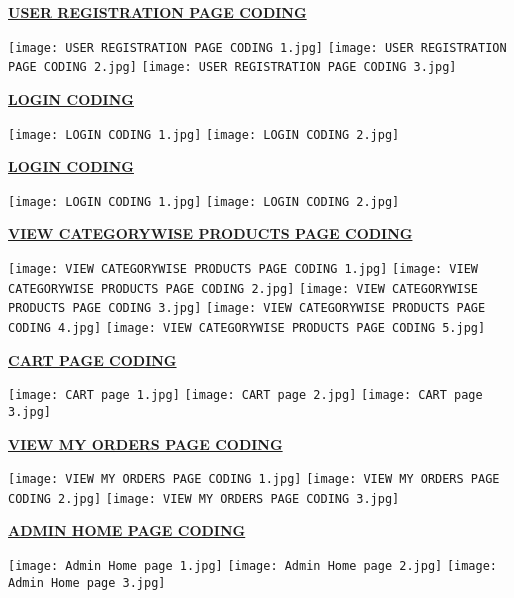 \documentclass[12pt]{report}
\begin{document}
    \pagebreak
    \textbf{\underline{\large USER REGISTRATION PAGE CODING}}
    \begin{center}
        \texttt{[image: USER REGISTRATION PAGE CODING 1.jpg]}
        \texttt{[image: USER REGISTRATION PAGE CODING 2.jpg]}
        \texttt{[image: USER REGISTRATION PAGE CODING 3.jpg]}
    \end{center}
    
    \pagebreak
    \textbf{\underline{\large LOGIN CODING}}
    \begin{center}
        \texttt{[image: LOGIN CODING 1.jpg]}
        \texttt{[image: LOGIN CODING 2.jpg]}
    \end{center}
    
    \pagebreak
    \textbf{\underline{\large LOGIN CODING}}
    \begin{center}
        \texttt{[image: LOGIN CODING 1.jpg]}
        \texttt{[image: LOGIN CODING 2.jpg]}
    \end{center}
    
    \pagebreak
    \textbf{\underline{\large VIEW CATEGORYWISE PRODUCTS PAGE CODING}}
    \begin{center}
        \texttt{[image: VIEW CATEGORYWISE PRODUCTS PAGE CODING 1.jpg]}
        \texttt{[image: VIEW CATEGORYWISE PRODUCTS PAGE CODING 2.jpg]}
        \texttt{[image: VIEW CATEGORYWISE PRODUCTS PAGE CODING 3.jpg]}
        \texttt{[image: VIEW CATEGORYWISE PRODUCTS PAGE CODING 4.jpg]}
        \texttt{[image: VIEW CATEGORYWISE PRODUCTS PAGE CODING 5.jpg]}
    \end{center}
    
    \pagebreak
    \textbf{\underline{\large CART PAGE CODING}}
    \begin{center}
        \texttt{[image: CART page 1.jpg]}
        \texttt{[image: CART page 2.jpg]}
        \texttt{[image: CART page 3.jpg]}
    \end{center}
    
     \pagebreak
    \textbf{\underline{\large VIEW MY ORDERS PAGE CODING}}
    \begin{center}
        \texttt{[image: VIEW MY ORDERS PAGE CODING 1.jpg]}
        \texttt{[image: VIEW MY ORDERS PAGE CODING 2.jpg]}
        \texttt{[image: VIEW MY ORDERS PAGE CODING 3.jpg]}
    \end{center}
    
    \pagebreak
    \textbf{\underline{\large ADMIN HOME PAGE CODING}}
    \begin{center}
        \texttt{[image: Admin Home page 1.jpg]}
        \texttt{[image: Admin Home page 2.jpg]}
        \texttt{[image: Admin Home page 3.jpg]}
    \end{center}
    
\end{document}
